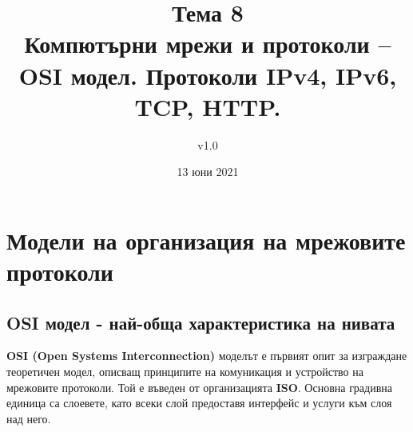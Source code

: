 \documentclass[fleqn,12pt]{article}
\title{Тема 8\\ Компютърни мрежи и протоколи – OSI модел. Протоколи IPv4,  IPv6, TCP, HTTP.}
\author{v1.0}
\date{13 юни 2021}
\begin{document}
\maketitle

\tableofcontents
\pagebreak

\section{Модели на организация на мрежовите протоколи}
\subsection{OSI модел - най-обща характеристика на нивата}
\textbf{OSI (Open Systems Interconnection)} моделът е първият опит за изграждане теоретичен модел, описващ принципите на комуникация и устройство на мрежовите протоколи.
Той е въведен от организацията \textbf{ISO}. Основна градивна единица са слоевете, като всеки слой предоставя интерфейс и услуги към слоя над него.
\end{document}
